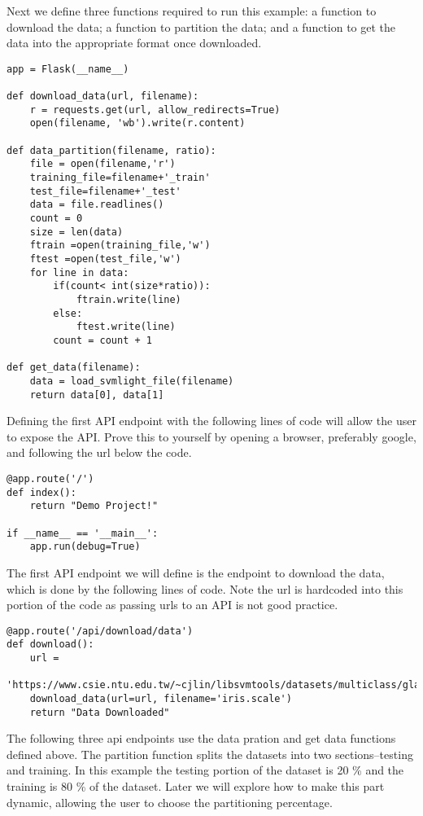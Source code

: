 Next we define three functions required to run this example: a
function to download the data; a function to partition the data; and a
function to get the data into the appropriate format once downloaded. 

\begin{lstlisting}
app = Flask(__name__)

def download_data(url, filename):
    r = requests.get(url, allow_redirects=True)
    open(filename, 'wb').write(r.content)

def data_partition(filename, ratio):
    file = open(filename,'r')
    training_file=filename+'_train'
    test_file=filename+'_test'
    data = file.readlines()
    count = 0
    size = len(data)
    ftrain =open(training_file,'w')
    ftest =open(test_file,'w')
    for line in data:
        if(count< int(size*ratio)):
            ftrain.write(line)
        else:
            ftest.write(line)
        count = count + 1        

def get_data(filename):
    data = load_svmlight_file(filename)
    return data[0], data[1]
\end{lstlisting} 

Defining the first API endpoint with the following lines of code will
allow the user to expose the API. Prove this to yourself by opening a
browser, preferably google, and following the url below the code.

\begin{lstlisting}
@app.route('/')
def index():
    return "Demo Project!"

if __name__ == '__main__':
    app.run(debug=True)
\end{lstlisting} 


The first API endpoint we will define is the endpoint to download the
data, which is done by the following lines of code. Note the url is
hardcoded into this portion of the code as passing urls to an API is
not good practice.  

\begin{lstlisting}
@app.route('/api/download/data')
def download():
    url =
    'https://www.csie.ntu.edu.tw/~cjlin/libsvmtools/datasets/multiclass/glass.scale'
    download_data(url=url, filename='iris.scale')
    return "Data Downloaded"
\end{lstlisting} 

The following three api endpoints use the data pration and get data
functions defined above. The partition function splits the datasets
into two sections--testing and training. In this example the testing
portion of the dataset is 20 \% and the training is 80 \% of the
dataset. Later we will explore how to make this part dynamic, allowing
the user to choose the partitioning percentage. 

